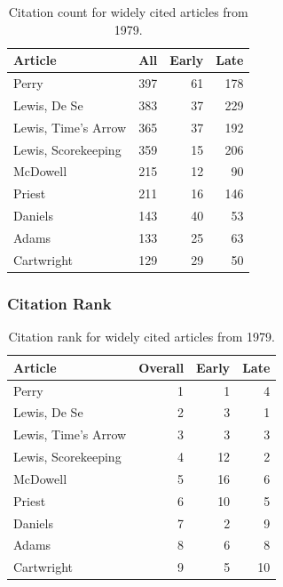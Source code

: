 \documentclass[
  10pt,
  letterpaper,
  DIV=11,
  numbers=noendperiod,
  twoside]{scrartcl}
\begin{document}
\begin{longtable}[]{@{}lrrr@{}}

\caption{\label{tbl-citation-count-1979}Citation count for widely cited
articles from 1979.}

\tabularnewline

\toprule\noalign{}
Article & All & Early & Late \\
\midrule\noalign{}
\endhead
\bottomrule\noalign{}
\endlastfoot
Perry & 397 & 61 & 178 \\
Lewis, De Se & 383 & 37 & 229 \\
Lewis, Time's Arrow & 365 & 37 & 192 \\
Lewis, Scorekeeping & 359 & 15 & 206 \\
McDowell & 215 & 12 & 90 \\
Priest & 211 & 16 & 146 \\
Daniels & 143 & 40 & 53 \\
Adams & 133 & 25 & 63 \\
Cartwright & 129 & 29 & 50 \\

\end{longtable}

\subsubsection*{Citation Rank}\label{citation-rank-3}

\begin{longtable}[]{@{}lrrr@{}}

\caption{\label{tbl-citation-rank-1979}Citation rank for widely cited
articles from 1979.}

\tabularnewline

\toprule\noalign{}
Article & Overall & Early & Late \\
\midrule\noalign{}
\endhead
\bottomrule\noalign{}
\endlastfoot
Perry & 1 & 1 & 4 \\
Lewis, De Se & 2 & 3 & 1 \\
Lewis, Time's Arrow & 3 & 3 & 3 \\
Lewis, Scorekeeping & 4 & 12 & 2 \\
McDowell & 5 & 16 & 6 \\
Priest & 6 & 10 & 5 \\
Daniels & 7 & 2 & 9 \\
Adams & 8 & 6 & 8 \\
Cartwright & 9 & 5 & 10 \\

\end{longtable}
\end{document}
